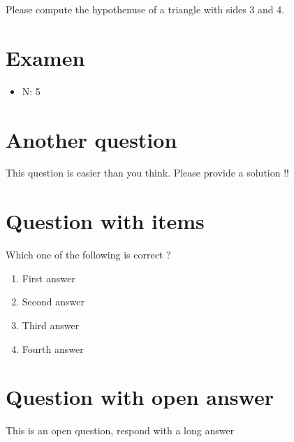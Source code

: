 \documentclass[a4paper,11pt,twoside]{article}
\begin{document}
Please compute the hypothenuse of a triangle with sides 3 and 4.



\subsection*{}
\label{sec:org27541f4}

\cleardoublepage

\section*{Examen}
\label{sec:org803f860}
\begin{itemize}
\item N: 5
\end{itemize}
\section*{Another question}
\label{sec:org8cb3fb0}

This question is easier than you think. Please provide a solution !!



\section*{Question with items}
\label{sec:org6d4b994}

Which one of the following is correct ?

\begin{enumerate}
\item First answer
\item Second answer
\item Third answer
\item Fourth answer
\end{enumerate}



\section*{Question with open answer}
\label{sec:org30e645e}

This is an open question, respond with a long answer


\subsection*{}
\label{sec:org3ea33df}

\cleardoublepage
\end{document}

